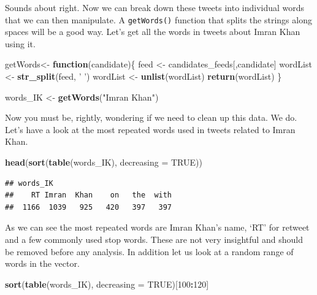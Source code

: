 \documentclass[]{article}
\newenvironment{Shaded}{\begin{snugshade}}{\end{snugshade}}
\newcommand{\KeywordTok}[1]{\textcolor[rgb]{0.13,0.29,0.53}{\textbf{#1}}}
\newcommand{\DataTypeTok}[1]{\textcolor[rgb]{0.13,0.29,0.53}{#1}}
\newcommand{\DecValTok}[1]{\textcolor[rgb]{0.00,0.00,0.81}{#1}}
\newcommand{\StringTok}[1]{\textcolor[rgb]{0.31,0.60,0.02}{#1}}
\newcommand{\OtherTok}[1]{\textcolor[rgb]{0.56,0.35,0.01}{#1}}
\newcommand{\ControlFlowTok}[1]{\textcolor[rgb]{0.13,0.29,0.53}{\textbf{#1}}}
\newcommand{\OperatorTok}[1]{\textcolor[rgb]{0.81,0.36,0.00}{\textbf{#1}}}
\newcommand{\NormalTok}[1]{#1}
\begin{document}
Sounds about right. Now we can break down these tweets into individual
words that we can then manipulate. A \texttt{getWords()} function that
splits the strings along spaces will be a good way. Let's get all the
words in tweets about Imran Khan using it.

\begin{Shaded}
\begin{Highlighting}[]
\NormalTok{getWords<-}\StringTok{ }\ControlFlowTok{function}\NormalTok{(candidate)\{}
\NormalTok{  feed <-}\StringTok{ }\NormalTok{candidates_feeds[,candidate]}
\NormalTok{  wordList <-}\StringTok{ }\KeywordTok{str_split}\NormalTok{(feed, }\StringTok{' '}\NormalTok{)}
\NormalTok{  wordList <-}\StringTok{ }\KeywordTok{unlist}\NormalTok{(wordList)}
  \KeywordTok{return}\NormalTok{(wordList)}
\NormalTok{\}}

\NormalTok{words_IK <-}\StringTok{ }\KeywordTok{getWords}\NormalTok{(}\StringTok{"Imran Khan"}\NormalTok{)}
\end{Highlighting}
\end{Shaded}

Now you must be, rightly, wondering if we need to clean up this data. We
do. Let's have a look at the most repeated words used in tweets related
to Imran Khan.

\begin{Shaded}
\begin{Highlighting}[]
\KeywordTok{head}\NormalTok{(}\KeywordTok{sort}\NormalTok{(}\KeywordTok{table}\NormalTok{(words_IK), }\DataTypeTok{decreasing =} \OtherTok{TRUE}\NormalTok{))}
\end{Highlighting}
\end{Shaded}

\begin{verbatim}
## words_IK
##    RT Imran  Khan    on   the  with 
##  1166  1039   925   420   397   397
\end{verbatim}

As we can see the most repeated words are Imran Khan's name, `RT' for
retweet and a few commonly used stop words. These are not very
insightful and should be removed before any analysis. In addition let us
look at a random range of words in the vector.

\begin{Shaded}
\begin{Highlighting}[]
\KeywordTok{sort}\NormalTok{(}\KeywordTok{table}\NormalTok{(words_IK), }\DataTypeTok{decreasing =} \OtherTok{TRUE}\NormalTok{)[}\DecValTok{100}\OperatorTok{:}\DecValTok{120}\NormalTok{]}
\end{Highlighting}
\end{Shaded}
\end{document}
